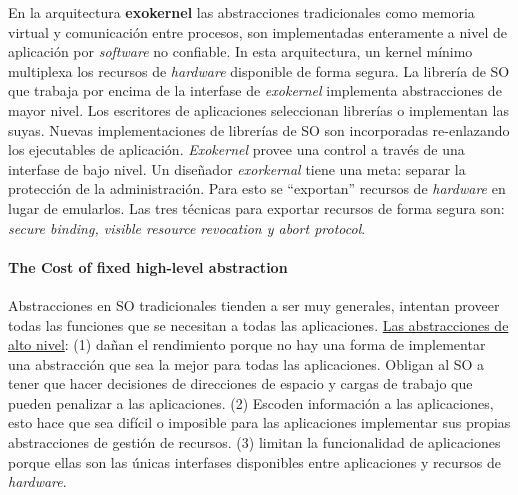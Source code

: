 
En la arquitectura \textbf{exokernel} las abstracciones tradicionales como memoria virtual y comunicación entre procesos, son implementadas enteramente a nivel de aplicación por \textit{software} no confiable. In esta arquitectura, un kernel mínimo multiplexa los recursos de \textit{hardware} disponible de forma segura. La librería de SO que trabaja por encima de la interfase de \textit{exokernel} implementa abstracciones de mayor nivel. Los escritores de aplicaciones seleccionan librerías o implementan las suyas. Nuevas implementaciones de librerías de SO son incorporadas re-enlazando los ejecutables de aplicación. \textit{Exokernel} provee una control a través de una interfase de bajo nivel. Un diseñador \textit{exorkernal} tiene una meta: separar la protección de la administración. Para esto se ``exportan'' recursos de \textit{hardware} en lugar de emularlos. Las tres técnicas para exportar recursos de forma segura son: \textit{secure binding, visible resource revocation \textnormal{y} 
abort protocol}.

\paragraph{\textnormal{\textbf{The Cost of fixed high-level abstraction}}}
Abstracciones en SO tradicionales tienden a ser muy generales, intentan proveer todas las funciones que se necesitan a todas las aplicaciones. \underline{Las abstracciones de alto nivel}: (1) dañan el rendimiento porque no hay una forma de implementar una abstracción que sea la mejor para todas las aplicaciones. Obligan al SO a tener que hacer decisiones de direcciones de espacio y cargas de trabajo que pueden penalizar a las aplicaciones. (2) Escoden información a las aplicaciones, esto hace que sea difícil o imposible para las aplicaciones implementar sus propias abstracciones de gestión de recursos. (3) limitan la funcionalidad de aplicaciones porque ellas son las únicas interfases disponibles entre aplicaciones y recursos de \textit{hardware}.

